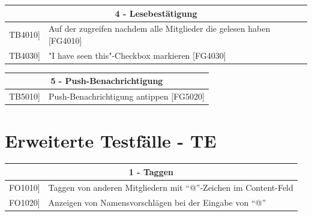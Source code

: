 \documentclass[a4paper]{scrreprt}
\begin{document}
	    \vspace{5mm}
	    
	    \begin{table}[h!]
	    	\centering
	    	\label{my-label}
	    	\begin{tabular}{p{2cm}p{12cm}}
	    		
	    		\multicolumn{2}{c}{\textbf{4 - Lesebestätigung}} \\ \hline
	    		\centering{[}TB4010{]} & Auf der  zugreifen nachdem alle Mitglieder die  gelesen haben {[}FG4010{]}\\
	    		\centering{[}TB4030{]}& "I have seen this"-Checkbox markieren {[}FG4030{]}\\ 
	    		
	    		\hline
	    	\end{tabular}
	    \end{table}
	    
	    \vspace{5mm}
	    
	    \begin{table}[h!]
	    	\centering
	    	\label{my-label}
	    	\begin{tabular}{p{2cm}p{12cm}}
	    		
	    		\multicolumn{2}{c}{\textbf{5 - Push-Benachrichtigung}} \\ \hline
	    		\centering{[}TB5010{]} & Push-Benachrichtigung antippen {[}FG5020{]}\\
	    		
	    		
	    		\hline
	    	\end{tabular}
	    \end{table}
	    
	    \clearpage
	    
	    \section{Erweiterte Testfälle - TE}
	    
	    \begin{table}[h]
	    	\centering
	    	\label{my-label}
	    	\begin{tabular}{p{2cm}p{12cm}}
	    		
	    		\multicolumn{2}{c}{\textbf{1 - Taggen}} \\ \hline
	    		\centering{[}FO1010{]} & Taggen von anderen Mitgliedern mit “@”-Zeichen im Content-Feld\\
	    		\centering{[}FO1020{]}& Anzeigen von Namensvorschlägen bei der Eingabe von “@”                               \\
	    		\hline
	    	\end{tabular}
	    \end{table}
	    
\end{document}
